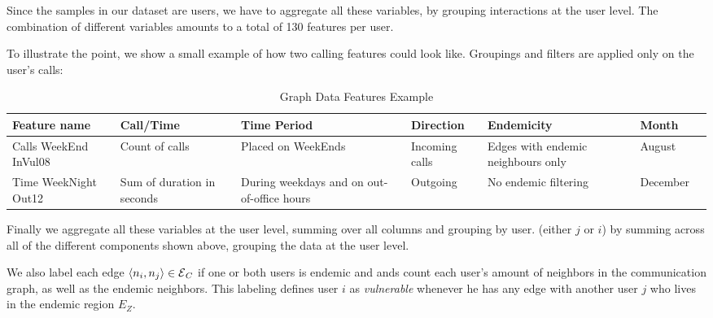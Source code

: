 
Since the samples in our dataset are users, we have to aggregate all these variables, by grouping interactions at the user level. The combination of different variables amounts to a total of 130 features per user.

To illustrate the point, we show a small example of how two calling features could look like. Groupings and filters are applied only on the user's calls:

\begin{table}[ht]
	\caption{Graph Data Features Example}
	\label{tab:data_example}
	\centering
	\begin{tabular} {|p{1.5cm}|p{1.5cm}|p{2cm}|p{1.5cm}|p{2cm}|p{1.5cm}|p{1cm}}
		\toprule
		Feature name & Call/Time & Time Period & Direction & Endemicity & Month\\
		\midrule
		Calls WeekEnd InVul08       & Count of calls & Placed on WeekEnds & Incoming calls & Edges with endemic neighbours only & August\\
		\midrule
		Time WeekNight Out12 & Sum of duration in seconds & During weekdays and on out-of-office hours & Outgoing   & No endemic filtering   & December \\
		
		\bottomrule
	\end{tabular}
\end{table}



Finally we aggregate all these variables at the user level, summing over all columns and grouping by user. 
(either $j$ or $i$) by summing across all of the different components shown above, grouping the data at the user level.

We also label each edge $\left< n_i, n_j \right> \in \operatorname{\mathcal{E}}_C$ if one or both users is endemic and
ands count each user's amount of neighbors in the communication graph, as well as the endemic neighbors. This labeling defines user $i$ as \textit{vulnerable} whenever he has any edge with another user $j$ who lives in the endemic region $E_Z$. 


